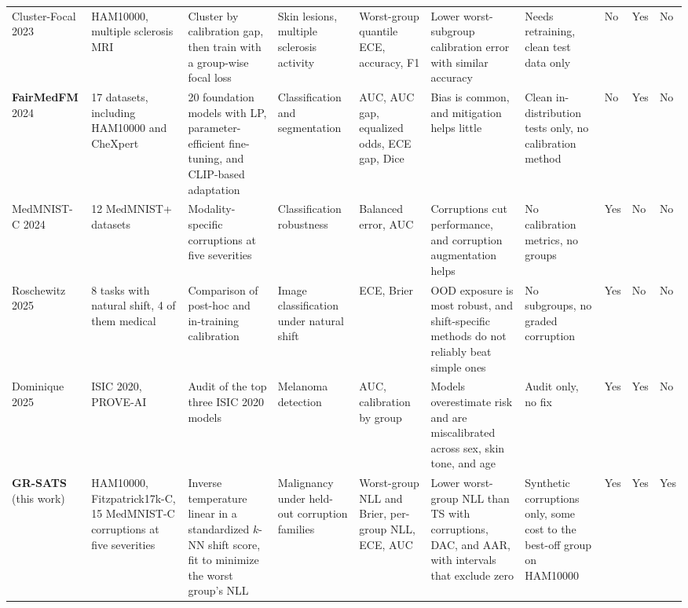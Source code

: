 \documentclass[sigconf,nonacm]{acmart}
\begin{document}
\begin{table}[tp]
\begin{tabularx}{\textwidth}{@{}P{1.7cm}P{2.0cm}LP{1.6cm}P{1.6cm}LP{2.2cm}C{0.75cm}C{0.85cm}C{1.0cm}@{}}
    \addlinespace
    Cluster-Focal 2023 \cite{shui2023clusterfocal} & HAM10000, multiple sclerosis MRI & Cluster by calibration gap, then train with a group-wise focal loss & Skin lesions, multiple sclerosis activity & Worst-group quantile ECE, accuracy, F1 & Lower worst-subgroup calibration error with similar accuracy & Needs retraining, clean test data only & No & Yes & No \\
    \addlinespace
    \textbf{FairMedFM} 2024 \cite{jin2024fairmedfm} & 17 datasets, including HAM10000 and CheXpert & 20 foundation models with LP, parameter-efficient fine-tuning, and CLIP-based adaptation & Classification and segmentation & AUC, AUC gap, equalized odds, ECE gap, Dice & Bias is common, and mitigation helps little & Clean in-distribution tests only, no calibration method & No & Yes & No \\
    \addlinespace
    MedMNIST-C 2024 \cite{disalvo2024medmnistc} & 12 MedMNIST+ datasets & Modality-specific corruptions at five severities & Classification robustness & Balanced error, AUC & Corruptions cut performance, and corruption augmentation helps & No calibration metrics, no groups & Yes & No & No \\
    \addlinespace
    Roschewitz 2025 \cite{roschewitz2025where} & 8 tasks with natural shift, 4 of them medical & Comparison of post-hoc and in-training calibration & Image classification under natural shift & ECE, Brier & OOD exposure is most robust, and shift-specific methods do not reliably beat simple ones & No subgroups, no graded corruption & Yes & No & No \\
    \addlinespace
    Dominique 2025 \cite{dominique2025calibration} & ISIC 2020, PROVE-AI & Audit of the top three ISIC 2020 models & Melanoma detection & AUC, calibration by group & Models overestimate risk and are miscalibrated across sex, skin tone, and age & Audit only, no fix & Yes & Yes & No \\
    \midrule
    \textbf{GR-SATS} (this work) & HAM10000, Fitzpatrick17k-C, 15 MedMNIST-C corruptions at five severities & Inverse temperature linear in a standardized $k$-NN shift score, fit to minimize the worst group's NLL & Malignancy under held-out corruption families & Worst-group NLL and Brier, per-group NLL, ECE, AUC & Lower worst-group NLL than TS with corruptions, DAC, and AAR, with intervals that exclude zero & Synthetic corruptions only, some cost to the best-off group on HAM10000 & Yes & Yes & Yes \\
    \bottomrule
  \end{tabularx}
\end{table}
\end{document}
